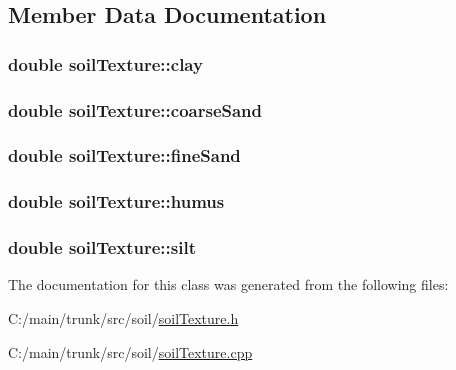 \subsection{Member Data Documentation}
\hypertarget{classsoil_texture_ad669f0e201bf2ec1b9291d3c6063bb8f}{
\subsubsection[{clay}]{\setlength{\rightskip}{0pt plus 5cm}double {\bf soilTexture::clay}}}
\label{classsoil_texture_ad669f0e201bf2ec1b9291d3c6063bb8f}
\hypertarget{classsoil_texture_a83b33165990e9ffad222f362ae15a86a}{
\subsubsection[{coarseSand}]{\setlength{\rightskip}{0pt plus 5cm}double {\bf soilTexture::coarseSand}}}
\label{classsoil_texture_a83b33165990e9ffad222f362ae15a86a}
\hypertarget{classsoil_texture_a07bda38527ba3925d216db999faa4049}{
\subsubsection[{fineSand}]{\setlength{\rightskip}{0pt plus 5cm}double {\bf soilTexture::fineSand}}}
\label{classsoil_texture_a07bda38527ba3925d216db999faa4049}
\hypertarget{classsoil_texture_a7d51a7c46adff457f90044b9f71fb9e0}{
\subsubsection[{humus}]{\setlength{\rightskip}{0pt plus 5cm}double {\bf soilTexture::humus}}}
\label{classsoil_texture_a7d51a7c46adff457f90044b9f71fb9e0}
\hypertarget{classsoil_texture_a5b05cdfbcf202642e069c8296a23e272}{
\subsubsection[{silt}]{\setlength{\rightskip}{0pt plus 5cm}double {\bf soilTexture::silt}}}
\label{classsoil_texture_a5b05cdfbcf202642e069c8296a23e272}


The documentation for this class was generated from the following files:\begin{DoxyCompactItemize}
\item 
C:/main/trunk/src/soil/\hyperlink{soil_texture_8h}{soilTexture.h}\item 
C:/main/trunk/src/soil/\hyperlink{soil_texture_8cpp}{soilTexture.cpp}\end{DoxyCompactItemize}
